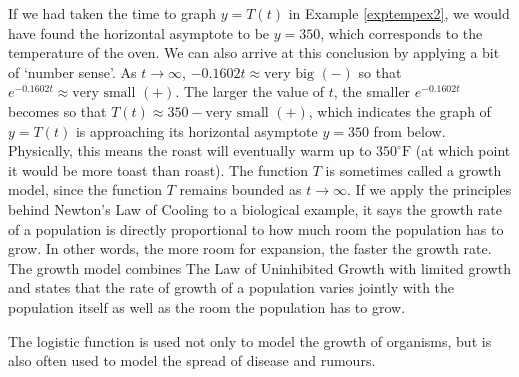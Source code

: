 If we had taken the time to graph $y=T(t)$ in Example \ref{exptempex2}, we would have found the horizontal asymptote to be $y = 350$, which corresponds to the temperature of the oven.  We can also arrive at this conclusion by applying a bit of `number sense'.  As $t \rightarrow \infty$, $-0.1602 t \approx \mbox{very big $(-)$}$ so that $e^{-0.1602 t} \approx \mbox{very small $(+)$}$.  The larger the value of $t$, the smaller $e^{-0.1602 t}$ becomes so that $T(t) \approx 350 -\mbox{very small $(+)$}$, which indicates the graph of $y=T(t)$ is approaching its horizontal asymptote $y=350$ from below.  Physically, this means the roast will eventually warm up to $350^{\circ}\mbox{F}$ (at which point it would be more toast than roast).  The function $T$ is sometimes called a   growth model, since the function $T$ remains bounded as $t \rightarrow \infty$.  If we apply the principles behind Newton's Law of Cooling to a biological example, it says the growth rate of a population is directly proportional to how much room the population has to grow.  In other words, the more room for expansion, the faster the growth rate. The  growth model combines The Law of Uninhibited Growth with limited growth and states that the rate of growth of a population varies jointly with the population itself as well as the room the population has to grow.   


\smallskip


\smallskip 

The logistic function is used not only to model the growth of organisms, but is also often used to model the spread of disease and rumours.

\medskip

